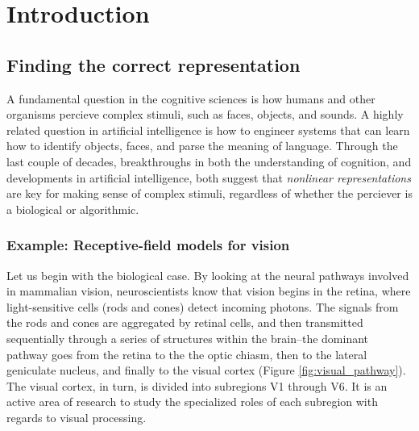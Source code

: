 
\chapter{Introduction} %

\label{Chapter1} %


\newcommand{\keyword}[1]{\textbf{#1}}
\newcommand{\tabhead}[1]{\textbf{#1}}
\newcommand{\code}[1]{\texttt{#1}}
\newcommand{\file}[1]{\texttt{\bfseries#1}}
\newcommand{\option}[1]{\texttt{\itshape#1}}


\section{Finding the correct representation}

A fundamental question in the cognitive sciences is how humans and
other organisms percieve complex stimuli, such as faces, objects, and
sounds.  A highly related question in artificial intelligence is how
to engineer systems that can learn how to identify objects, faces, and
parse the meaning of language.  Through the last couple of decades,
breakthroughs in both the understanding of cognition, and developments
in artificial intelligence, both suggest that \emph{nonlinear
  representations} are key for making sense of complex stimuli,
regardless of whether the perciever is a biological or algorithmic.

\subsection{Example: Receptive-field models for vision}

Let us begin with the biological case.  By looking at the neural
pathways involved in mammalian vision, neuroscientists know that
vision begins in the retina, where light-sensitive cells (rods and
cones) detect incoming photons.  The signals from the rods and cones
are aggregated by retinal cells, and then transmitted sequentially
through a series of structures within the brain--the dominant pathway
goes from the retina to the the optic chiasm, then to the lateral
geniculate nucleus, and finally to the visual cortex (Figure
\ref{fig:visual_pathway}).  The visual cortex, in turn, is divided
into subregions V1 through V6.  It is an active area of research to
study the specialized roles of each subregion with regards to visual
processing.

